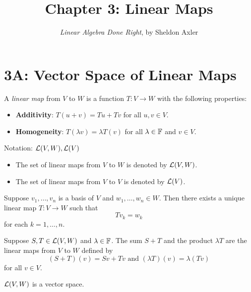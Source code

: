 \documentclass{extarticle}
\title{\vspace{-2em}Chapter 3: Linear Maps}
\author{\emph{Linear Algebra Done Right}, by Sheldon Axler}
\date{}
\begin{document}
\maketitle 
\tableofcontents

\newpage 
\section*{3A: Vector Space of Linear Maps}

\begin{definition}
    A \emph{linear map} from \(V\) to \(W\) is a function \(T \colon V \to W\) with the following 
    properties:
    \begin{itemize}
        \item \textbf{Additivity}: \(T(u + v) = Tu + Tv\) for all \(u, v \in V\).
        \item \textbf{Homogeneity}: \(T(\lambda v) = \lambda T(v)\) for all \(\lambda \in \mathbb{F}\) and \(v \in V\).
    \end{itemize}
\end{definition}

Notation: \(\mathcal{L}(V, W), \mathcal{L}(V)\)

\begin{itemize}
    \item The set of linear maps from \(V\) to \(W\) is denoted by \(\mathcal{L} (V, W)\).
    \item The set of linear maps from \(V\) to \(V\) is denoted by \(\mathcal{L} (V)\). 
\end{itemize}


\begin{lemma}
    Suppose \(v_1, \ldots, v_n\) is a basis of \(V\) and \(w_1, \ldots, w_n \in W\). Then 
    there exists a unique linear map \(T \colon V \to W\) such that 
    \[T v_k = w_k\]
    for each \(k = 1, \ldots, n\).
\end{lemma}

\begin{definition}
    Suppose \(S, T \in \mathcal{L}(V, W)\) and \(\lambda \in \mathbb{F}\). The sum \(S+ T\) and the 
    product \(\lambda T\) are the linear maps from \(V\) to \(W\) defined by 
    \[(S+T)(v) = Sv + Tv \text{  and  } (\lambda T)(v) = \lambda (Tv)\]
    for all \(v \in V\).
\end{definition}

\begin{remark}
    \(\mathcal{L}(V, W)\) is a vector space.
\end{remark}
\end{document}
